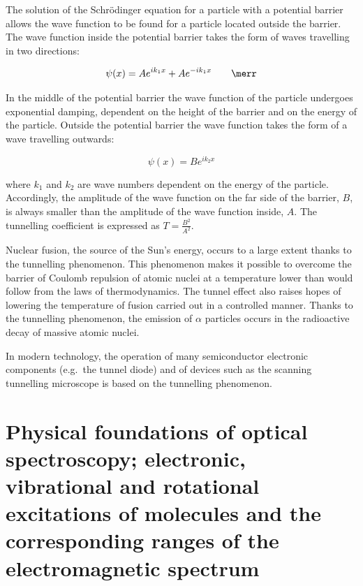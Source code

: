 The solution of the Schrödinger equation for a particle with a potential barrier allows the wave function to be found for a particle located outside the barrier. The wave function inside the potential barrier takes the form of waves travelling in two directions:

\begin{equation}
    \psi(x) = Ae^{i k_1 x} + Ae^{-i k_1 x} \qquad \merr
\end{equation}

In the middle of the potential barrier the wave function of the particle undergoes exponential damping, dependent on the height of the barrier and on the energy of the particle. Outside the potential barrier the wave function takes the form of a wave travelling outwards:

\begin{equation}
    \psi(x) = Be^{i k_2 x}
\end{equation}

where $k_1$ and $k_2$ are wave numbers dependent on the energy of the particle. Accordingly, the amplitude of the wave function on the far side of the barrier, $B$, is always smaller than the amplitude of the wave function inside, $A$. The tunnelling coefficient is expressed as $T = \frac{B^2}{A^2}$.

Nuclear fusion, the source of the Sun's energy, occurs to a large extent thanks to the tunnelling phenomenon. This phenomenon makes it possible to overcome the barrier of Coulomb repulsion of atomic nuclei at a temperature lower than would follow from the laws of thermodynamics. The tunnel effect also raises hopes of lowering the temperature of fusion carried out in a controlled manner. Thanks to the tunnelling phenomenon, the emission of $\alpha$ particles occurs in the radioactive decay of massive atomic nuclei.

In modern technology, the operation of many semiconductor electronic components (e.g.\ the tunnel diode) and of devices such as the scanning tunnelling microscope is based on the tunnelling phenomenon.

\section{Physical foundations of optical spectroscopy; electronic, vibrational and rotational excitations of molecules and the corresponding ranges of the electromagnetic spectrum}

